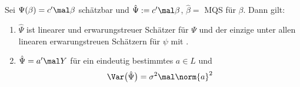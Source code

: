 \begin{satz}\label{satz3.9GaussMarkovTheorem}\enter
	Sei $\Psi(\beta)=c'\mal\beta$ schätzbar und $\hat{\Psi}:=c'\mal\beta$, $\hat{\beta}=$ MQS für $\beta$.
	Dann gilt:
	\begin{enumerate}[label=(\arabic*)]
		\item $\hat{\Psi}$ ist linearer und erwarungstreuer Schätzer für $\Psi$ und der einzige unter allen linearen erwarungstreuen Schätzern für $\psi$ mit .
		\label{item:satz3.9(1)}
		\item $\hat{\Psi}=a'\mal Y$ für ein eindeutig bestimmtes $a\in L$ und 
		\label{item:satz3.9(2)}
		\begin{align*}
			\Var\big(\hat{\Psi}\big)=\sigma^2\mal\norm{a}^2
		\end{align*}
	\end{enumerate}
\end{satz}

